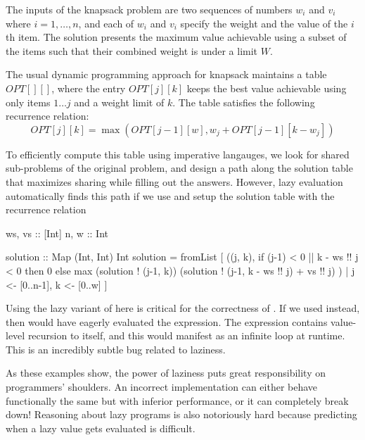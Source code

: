\documentclass[acmsmall,review]{acmart}\settopmatter{}
\begin{document}
The inputs of the knapsack problem are two sequences of numbers $w_i$
and $v_i$ where $i = 1, \dots, n$, and each of $w_i$ and $v_i$ specify
the weight and the value of the $i$th item. The solution presents the
maximum value achievable using a subset of the items such that their
combined weight is under a limit $W$.

The usual dynamic programming approach for knapsack maintains a
table $OPT[][]$, where the entry $OPT[j][k]$ keeps the best value
achievable using only items $1\dots j$ and a weight limit of $k$. The
table satisfies the following recurrence relation: $$OPT[j][k]
= \max(OPT[j-1][w], w_j + OPT[j-1][k-w_j])$$

To efficiently compute this table using imperative langauges, we look
for shared sub-problems of the original problem, and design a path
along the solution table that maximizes sharing while filling out the
answers.
%
However, lazy evaluation automatically finds this path if we
use  and setup the solution table with the
recurrence relation 
\begin{inlinecode}
ws, vs :: [Int]
n,  w  :: Int

solution :: Map (Int, Int) Int
solution = fromList [ ((j, k),
                       if (j-1) < 0 || k - ws !! j < 0
                       then 0
                       else max (solution ! (j-1, k))
                                (solution ! (j-1, k - ws !! j) + vs !! j)
                      )
                    | j <- [0..n-1], k <- [0..w] ]
\end{inlinecode}

Using the lazy variant of  here is critical for the correctness
of . If we used  instead, then 
would have eagerly evaluated the  expression. The  expression
contains value-level recursion to itself, and this would manifest as an infinite
loop at runtime. This is an incredibly subtle bug related to laziness.

As these examples show, the power of laziness puts great
responsibility on programmers' shoulders. An incorrect implementation
can either behave functionally the same but with inferior performance,
or it can completely break down! Reasoning about lazy programs is also
notoriously hard because predicting when a lazy value gets evaluated
is difficult.

\end{document}
